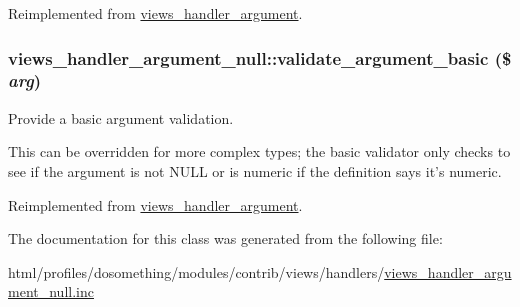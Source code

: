 Reimplemented from \hyperlink{classviews__handler__argument_af9ddabf5d386782c8ffc5785b7ae4263}{views\_\-handler\_\-argument}.\hypertarget{classviews__handler__argument__null_afc4fd62d96247a2ebebbd7e44f0742ce}{
\subsubsection[{validate\_\-argument\_\-basic}]{\setlength{\rightskip}{0pt plus 5cm}views\_\-handler\_\-argument\_\-null::validate\_\-argument\_\-basic (\$ {\em arg})}}
\label{classviews__handler__argument__null_afc4fd62d96247a2ebebbd7e44f0742ce}
Provide a basic argument validation.

This can be overridden for more complex types; the basic validator only checks to see if the argument is not NULL or is numeric if the definition says it's numeric. 

Reimplemented from \hyperlink{classviews__handler__argument_ab2ca8b443e4b53e1ca532faf0f4565f5}{views\_\-handler\_\-argument}.

The documentation for this class was generated from the following file:\begin{DoxyCompactItemize}
\item 
html/profiles/dosomething/modules/contrib/views/handlers/\hyperlink{views__handler__argument__null_8inc}{views\_\-handler\_\-argument\_\-null.inc}\end{DoxyCompactItemize}
